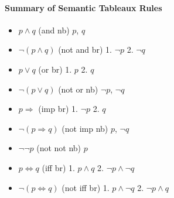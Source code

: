     \paragraph{Summary of Semantic Tableaux Rules}
      \begin{itemize}
        \item $ p \land q $ (and nb) $p$, $q$
        \item $ \lnot ( p \land q ) $ (not and br) 1. $ \lnot p $ 2. $ \lnot q $
        \item $ p \lor q $ (or br) 1. $p$ 2. $q$
        \item $ \lnot ( p \lor q ) $ (not or nb) $ \lnot p $, $ \lnot q $
        \item $ p \Rightarrow $ (imp br) 1. $ \lnot p $ 2. $ q $
        \item $ \lnot ( p \Rightarrow q ) $ (not imp nb) $p$, $\lnot q$
        \item $ \lnot \lnot p $ (not not nb) $ p $
        \item $ p \Leftrightarrow q $ (iff br) 1. $ p \land q $ 2. $ \lnot p
          \land \lnot q $
        \item $ \lnot ( p \Leftrightarrow q ) $ (not iff br) 1. $ p \land
          \lnot q $ 2. $ \lnot p \land q $
      \end{itemize}
